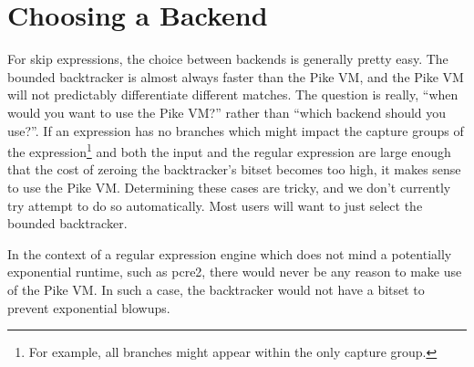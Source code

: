 \section{Choosing a Backend}

For skip expressions, the choice between backends is generally
pretty easy. The bounded backtracker is almost always faster
than the Pike VM, and the Pike VM will not predictably
differentiate different matches. The question is really,
``when would you want to use the Pike VM?'' rather than
``which backend should you use?''. If an expression has
no branches which might impact the capture groups of
the expression\footnote{For example, all branches might appear
within the only capture group.} and both the input and
the regular expression are large enough that the cost of
zeroing the backtracker's bitset becomes too high, it
makes sense to use the Pike VM. Determining these cases
are tricky, and we don't currently try attempt to do
so automatically. Most users will want to just select
the bounded backtracker.

In the context of a regular expression engine which does not
mind a potentially exponential runtime, such as pcre2, there
would never be any reason to make use of the Pike VM. In such
a case, the backtracker would not have a bitset to prevent
exponential blowups.
